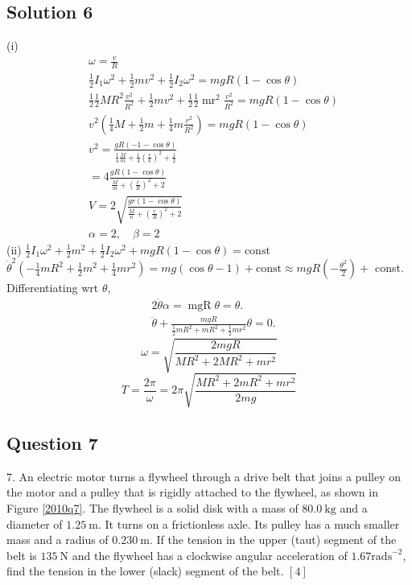 \documentclass{article}
\begin{document}
\subsection{Solution 6}
(i)
\begin{equation}
	\begin{aligned}
		&\omega=\frac{v}{R}\\
		&\frac{1}{2}I_{1} \omega^{2}+\frac{1}{2} m v^{2}+\frac{1}{2} I_{2} \omega^{2}=m g R(1-\cos \theta)\\
		&\frac{1}{2} \frac{1}{2} M R^{2} \frac{v^{2}}{R^{2}}+\frac{1}{2} m v^{2}+\frac{1}{2} \frac{1}{2} \operatorname{mr}^{2} \frac{v^{2}}{R^{2}}=mgR(1-\cos \theta)\\
		&v^{2}\left(\frac{1}{4} M+\frac{1}{2} m+\frac{1}{4} m \frac{r^{2}}{R^{2}}\right)=m g R(1-\cos \theta)\\
		&v^{2}=\frac{g R(-1-\cos \theta)}{\frac{1}{4}\frac{M}{m}+\frac{1}{4}\left(\frac{r}{k}\right)^{2}+\frac{1}{2}}\\
		&=4 \frac{g R(1-\cos \theta)}{\frac{M}{m}+\left(\frac{r}{R}\right)^{2}+2}\\
		&V=2 \sqrt{\frac{{g r(1-\cos \theta)}}{\frac{M}{n}+\left(\frac{r}{R}\right)^{2}+2}}\\
		&\alpha=2, \quad \beta=2
	\end{aligned}
\end{equation}
(ii) 
$\frac{1}{2} I_{1} \omega^{2}+\frac{1}{2} m^{2}+\frac{1}{2} I_{2} \omega^{2}+m g R(1-\cos \theta)=\text{const}$ \\
$\dot{\theta}^{2}\left(-\frac{1}{4} m R^{2}+\frac{1}{2} m^{2}+\frac{1}{4} m r^{2}\right)=m g(\cos \theta-1)+\text{const}\approx m g R\left(-\frac{\theta^{2}}{2}\right)+$ const. \\
Differentiating wrt $\theta$,
$$
\begin{aligned}
	&2 \ddot{\theta} \alpha=\operatorname{mgR} \theta=\theta . \\
	&\ddot{\theta}+\frac{m g R}{\frac{1}{2} m R^{2}+m R^{2}+\frac{1}{2} m r^{2}} \theta=0 .
\end{aligned}
$$
$$
\omega=\sqrt{\frac{2 m g R}{M R^{2}+2 {M R}^{2}+m r^{2}}}
$$
\begin{equation}
	T=\frac{2 \pi}{\omega}=2 \pi \sqrt{\frac{M R^{2}+2 m R^{2}+m r^{2}}{2 m g}}
\end{equation}
\subsection{Question 7}
7. An electric motor turns a flywheel through a drive belt that joins a pulley on the motor and a pulley that is rigidly attached to the flywheel, as shown in Figure \ref{2010q7}. The flywheel is a solid disk with a mass of $80.0 \mathrm{~kg}$ and a diameter of $1.25 \mathrm{~m}$. It turns on a frictionless axle. Its pulley has a much smaller mass and a radius of $0.230 \mathrm{~m}$. If the tension in the upper (taut) segment of the belt is $135 \mathrm{~N}$ and the flywheel has a clockwise angular acceleration of $1.67 \mathrm{rads}^{-2}$, find the tension in the lower (slack) segment of the belt.
$[4]$
\end{document}
